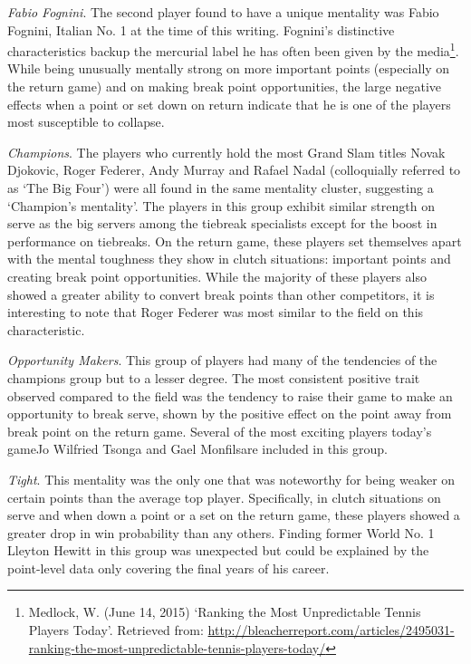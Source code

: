 \documentclass{Latex/svjour3}
\begin{document}
\textit{Fabio Fognini}. The second player found to have a unique
mentality was Fabio Fognini, Italian No. 1 at the time of this
writing. Fognini's distinctive characteristics backup the mercurial
label he has often been given by the media\footnote{Medlock,
  W. (June 14, 2015) `Ranking the Most Unpredictable Tennis Players
  Today'. Retrieved from: \url{http://bleacherreport.com/articles/2495031-ranking-the-most-unpredictable-tennis-players-today/}}. While being unusually
mentally strong on more important points (especially on the return
game) and on making break point opportunities, the large negative
effects when a point or set down on return indicate that he is one of the
players most susceptible to collapse.

\textit{Champions}. The players who currently hold the most Grand Slam
titles Novak Djokovic, Roger Federer, Andy Murray and Rafael Nadal
(colloquially referred to as `The Big Four') were all found in the
same mentality cluster, suggesting a `Champion's mentality'. The
players in this group exhibit similar strength on serve as the big servers among the
tiebreak specialists except for the boost in performance on
tiebreaks. On the return game, these players set themselves apart with
the mental toughness they show in clutch situations: important points and creating break
point opportunities. While the majority of these players also showed a
greater ability to convert break points than other competitors, it is
interesting to note that Roger Federer was most similar to the field
on this characteristic. 

\textit{Opportunity Makers}. This group of players had many of the
tendencies of the champions group but to a lesser degree. The most
consistent positive trait observed compared to the field was the
tendency to raise their game to make an opportunity to break serve,
shown by the positive effect on the point away from break point on
the return game. Several of the most exciting players today's
game\textemdash Jo Wilfried Tsonga and Gael Monfils\textemdash are
included in this group.

\textit{Tight}. This mentality was the only one that was noteworthy
for being weaker on certain points than the average top
player. Specifically, in clutch situations on serve and when down a
point or a set on the return game, these players showed a greater drop
in win probability than any others. Finding former
World No. 1 Lleyton Hewitt in this group was unexpected but could be
explained by the point-level data only covering the final years of his career.
\end{document}
